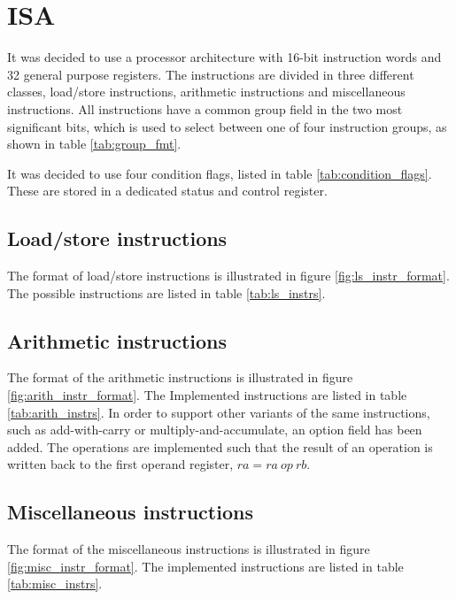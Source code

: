 \section{ISA}

It was decided to use a processor architecture with 16-bit instruction words and 32 general purpose registers.
The instructions are divided in three different classes, load/store instructions, arithmetic instructions
and miscellaneous instructions. All instructions have a common group field in the two most significant bits,
which is used to select between one of four instruction groups, as shown in table \ref{tab:group_fmt}.

It was decided to use four condition flags, listed in table \ref{tab:condition_flags}. These are stored in
a dedicated status and control register.




\subsection{Load/store instructions}
The format of load/store instructions is illustrated in figure \ref{fig:ls_instr_format}. The possible
instructions are listed in table \ref{tab:ls_instrs}.




\subsection{Arithmetic instructions}
The format of the arithmetic instructions is illustrated in figure \ref{fig:arith_instr_format}. The Implemented
instructions are listed in table \ref{tab:arith_instrs}. In order to support other variants of the same instructions,
such as add-with-carry or multiply-and-accumulate, an option field has been added. The operations are implemented such
that the result of an operation is written back to the first operand register, $ra = ra~op~rb$.




\subsection{Miscellaneous instructions}
The format of the miscellaneous instructions is illustrated in figure \ref{fig:misc_instr_format}. The
implemented instructions are listed in table \ref{tab:misc_instrs}.



